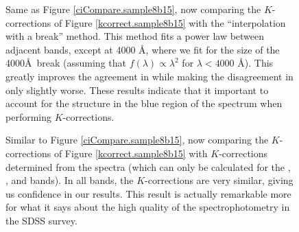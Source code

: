 \clearpage
{}
\begin{figure}
\figurenum{\fignum}
\caption{\label{cibreakCompare.sample8b15} Same as Figure
\ref{ciCompare.sample8b15}, now comparing the $K$-corrections of Figure
\ref{kcorrect.sample8b15} with the ``interpolation with a break''
method. This method fits a power law between adjacent bands, except at
4000 \AA, where we fit for the size of the 4000\AA\ break (assuming
that $f(\lambda)\propto \lambda^2$ for $\lambda<4000$ \AA). This
greatly improves the agreement in  while making the
disagreement in  only slightly worse. These results
indicate that it important to account for the structure in the blue
region of the spectrum when performing $K$-corrections.}
\end{figure}

\clearpage
{}
\begin{figure}
\figurenum{\fignum}
\caption{\label{specK} Similar to Figure \ref{ciCompare.sample8b15},
now comparing the $K$-corrections of Figure \ref{kcorrect.sample8b15}
with $K$-corrections determined from the spectra (which can only be
calculated for the , , and 
bands). In all bands, the $K$-corrections are very similar, giving us
confidence in our results. This result is actually remarkable more for
what it says about the high quality of the spectrophotometry in the
SDSS survey.}
\end{figure}

\clearpage
{}
\begin{figure}
\figurenum{\fignum}
\caption{\label{aperturevsz.M.sample8b15} }
\end{figure}

